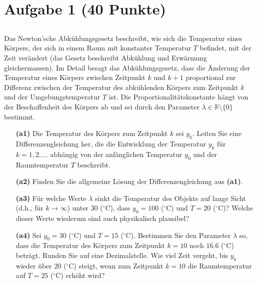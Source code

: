 \vspace{1cm}
\renewcommand{\labelenumi}{\theenumi.}
\section*{Aufgabe 1 (40 Punkte)}
\vspace{0.4cm}
\subsection*{}
Das Newton'sche Abkühlungsgesetz beschreibt, wie sich die Temperatur eines Körpers, der sich in einem Raum mit konstanter Temperatur $ T $ befindet, mit der Zeit verändert (das Gesetz beschreibt Abkühlung und Erwärmung gleichermassen).
Im Detail besagt das Abkühlungsgesetz, dass die Änderung der Temperatur eines Körpers zwischen Zeitpunkt $ k $ und $ k+1 $ proportional zur Differenz zwischen der Temperatur des abkühlenden Körpers zum Zeitpunkt $ k $ und der Umgebungstemperatur $ T $ ist. Die Proportionalitätskonstante hängt von der Beschaffenheit des Körpers ab und sei durch den Parameter $ \lambda \in \mathbb{R} \setminus \{0\} $ bestimmt.
\begin{enumerate}
	\item[\textbf{(a1)}]
	Die Temperatur des Körpers zum Zeitpunkt $ k $ sei $ y_k $.
	Leiten Sie eine Differenzengleichung her, die die Entwicklung der Temperatur $ y_k $ für $ k = 1,2,... $ abhängig von der anfänglichen Temperatur $ y_0 $ und der Raumtemperatur $ T  $ beschreibt.
	\item[\textbf{(a2)}] 
	Finden Sie die allgemeine Lösung der Differenzengleichung aus \textbf{(a1)}.
	\item[\textbf{(a3)}] 
	Für welche Werte $ \lambda $ sinkt die Temperatur des Objekts auf lange Sicht (d.h., für $ k \to \infty $) unter 30 ($ ^\circ $C), dass $ y_0 = 100 $ ($ ^\circ $C) und $ T= 20 $ ($ ^\circ $C)?
	Welche dieser Werte wiederum sind auch physikalisch plausibel?
	\item[\textbf{(a4)}]
	Sei $ y_0 = 30  $ ($ ^\circ  $C) und $ T = 15 $ ($ ^\circ  $C).
	Bestimmen Sie den Parameter $ \lambda $ so, dass die Temperatur
	des Körpers zum Zeitpunkt $ k= 10 $ noch $ 16.6 $ ($ ^\circ  $C) beträgt.
	Runden Sie auf eine Dezimalstelle. Wie viel Zeit vergeht, bis $ y_k $ wieder über $ 20 $ ($ ^\circ  $C) steigt, wenn zum Zeitpunkt $ k = 10 $ die Raumtemperatur auf $ T = 25 $ ($ ^\circ  $C) erhöht wird?
\end{enumerate}
\ \\

